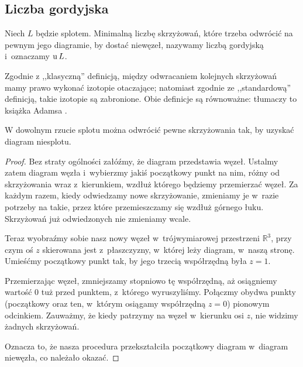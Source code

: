 
\subsection{Liczba gordyjska}
%

\begin{definition}
    Niech $L$ będzie splotem.
    Minimalną liczbę skrzyżowań, które trzeba odwrócić na pewnym jego diagramie, by dostać niewęzeł, nazywamy liczbą gordyjską i~oznaczamy $\operatorname{u} L$.
\end{definition}

Zgodnie z ,,klasyczną'' definicją, między odwracaniem kolejnych skrzyżowań mamy prawo wykonać izotopie otaczające; natomiast zgodnie ze ,,standardową'' definicją, takie izotopie są zabronione.
Obie definicje są równoważne: tłumaczy to książka Adamsa \cite[s. 58]{adams94}.

\begin{lemma}
\label{lem:unknotting_well_defined}%
    W dowolnym rzucie splotu można odwrócić pewne skrzyżowania tak, by uzyskać diagram niesplotu.
\end{lemma}

\begin{proof}
    Bez straty ogólności załóźmy, że diagram przedstawia węzeł.
    Ustalmy zatem diagram węzła i~wybierzmy jakiś początkowy punkt na nim, różny od skrzyżowania wraz z~kierunkiem, wzdłuż którego będziemy przemierzać węzeł.
    Za każdym razem, kiedy odwiedzamy nowe skrzyżowanie, zmieniamy je w~razie potrzeby na takie, przez które przemieszczamy się wzdłuż górnego łuku.
    Skrzyżowań już odwiedzonych nie zmieniamy wcale.

    Teraz wyobraźmy sobie nasz nowy węzeł w~trójwymiarowej przestrzeni $\mathbb R^3$, przy czym oś $z$ skierowana jest z~płaszczyzny, w~której leży diagram, w~naszą stronę.
    Umieśćmy początkowy punkt tak, by jego trzecią współrzędną była $z = 1$.

    Przemierzając węzeł, zmniejszamy stopniowo tę współrzędną, aż osiągniemy wartość $0$ tuż przed punktem, z~którego wyruszyliśmy.
    Połączmy obydwa punkty (początkowy oraz ten, w~którym osiągamy współrzędną $z = 0$) pionowym odcinkiem.
    Zauważmy, że kiedy patrzymy na węzeł w~kierunku osi $z$, nie widzimy żadnych skrzyżowań.

    Oznacza to, że nasza procedura przekształciła początkowy diagram w~diagram niewęzła, co należało okazać.
\end{proof}

